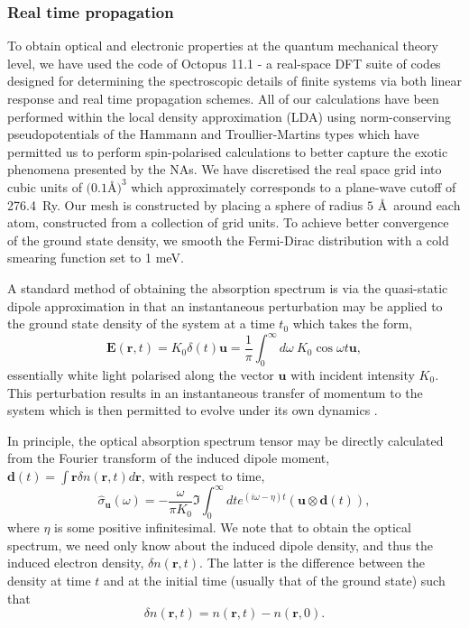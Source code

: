 \subsubsection{Real time propagation}
\label{sec:TDDFT_Thr}
To obtain optical and electronic properties at the quantum mechanical theory level, we have used the code of Octopus 11.1 \cite{Octopus2003,Octopus_2006,Oct_2015,Oct_paralel,Oct_2020} - a real-space DFT suite of codes designed for determining the spectroscopic details of finite systems via both linear response and real time propagation schemes. All of our calculations have been performed within the local density approximation (LDA) \cite{KS} using norm-conserving pseudopotentials of the Hammann \cite{Hamann} and Troullier-Martins \cite{Troullier} types \cite{FHI} which have permitted us to perform spin-polarised calculations to better capture the exotic phenomena presented by the NAs. We have discretised the real space grid into cubic units of $(0.1$\AA$)^{3}$ which approximately corresponds to a plane-wave cutoff of 276.4~Ry. Our mesh is constructed by placing a sphere of radius $5$ \AA \ around each atom, constructed from a collection of grid units. To achieve better convergence of the ground state density, we smooth the Fermi-Dirac distribution with a cold smearing function \cite{Smearing} set to 1 meV.

A standard method of obtaining the absorption spectrum is via the quasi-static dipole approximation in that an instantaneous perturbation may be applied to the ground state density of the system at a time $t_{0}$ which takes the form, 
\begin{equation}
    \textbf{E}(\textbf{r},t) = K_{0}\delta(t)\textbf{u} = \frac{1}{\pi} \int_{0}^{\infty}d\omega~K_{0}\cos{\omega t} \textbf{u},
\end{equation}
essentially white light polarised along the vector $\textbf{u}$ with incident intensity $K_{0}$. This perturbation results in an instantaneous transfer of momentum to the system which is then permitted to evolve under its own dynamics \cite{Yabana1996}.


In principle, the optical absorption spectrum tensor may be directly calculated from the Fourier transform of the induced dipole moment, $\mathbf{d}(t)=\int  \mathbf{r}\delta n(\mathbf{r},t) d\mathbf{r}$, with respect to time,
\begin{equation}
    \hat{\sigma}_{\textbf{u}}(\omega) = - \frac{\omega}{\pi K_{0}}  \Im \int_{0}^{\infty} dt e^{ (i\omega -\eta)t } \left(\textbf{u}\otimes \mathbf{d}(t)\right)
    \label{eqn:DFTSigma},
\end{equation}
where $\eta$ is some positive infinitesimal. We note that to obtain the optical spectrum, we need only know about the induced dipole density, and thus the induced electron density, $\delta n(\mathbf{r},t)$. The latter is the difference between the density at time $t$ and at the initial time (usually that of the ground state) such that
\begin{equation}
    \delta n(\textbf{r}, t) = n(\textbf{r}, t) - n(\textbf{r},0).
    \label{eqn:dense}
\end{equation}

